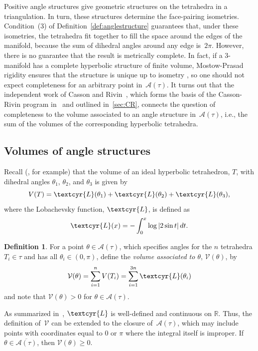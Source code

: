 \documentclass[reqno]{amsart}
\newcommand{\R}{\mathbb{R}}			%
\newcommand{\lob}{{\textcyr{L}}}		%
\theoremstyle{plain}
\theoremstyle{definition}
\newtheorem{defn}{Definition}[section]
\begin{document}
 Positive angle structures give geometric structures on the tetrahedra in a triangulation.  In turn, these structures determine the face-pairing isometries.  Condition~(3) of Definition~\ref{def:anglestructure} guarantees that, under these isometries, the tetrahedra fit together to fill the space around the edges of the manifold, because the sum of dihedral angles around any edge is~$2\pi$.  However, there is no guarantee that the result is metrically complete.  In fact, if a 3-manifold has a complete hyperbolic structure of finite volume, Mostow-Prasad rigidity ensures that the structure is unique up to isometry \cite{MostowRigidity} \cite{PrasadRigidity}, so one should not expect completeness for an arbitrary point in~$\mathcal A(\tau)$.  It turns out that the independent work of Casson and Rivin~\cite{Rivin}, which forms the basis of the Casson-Rivin program in~\cite{AngledtoHyperbolic} and outlined in~\ref{sec:CR}, connects the question of completeness to the volume associated to an angle structure in~$\mathcal A(\tau)$, i.e., the sum of the volumes of the corresponding hyperbolic tetrahedra.
 
 \subsection{Volumes of angle structures} \label{sec:volume}

Recall (\cite{MilnorHypGeom}, for example) that the volume of an ideal hyperbolic tetrahedron, $T$, with dihedral angles $\theta_1$, $\theta_2$, and $\theta_3$ is given by
$$
V(T)=\lob(\theta_1)+\lob(\theta_2)+\lob(\theta_3),
$$
where the Lobachevsky function, $\lob$, is defined as
$$
\lob(x)=-\int_0^x\log|2\sin t|\,dt.
$$  
\begin{defn}\label{def:volume}
For a point $\theta\in\mathcal A(\tau)$, which specifies angles for the $n$ tetrahedra $T_i\in\tau$ and has all $\theta_i\in(0,\pi)$, define the \emph{volume associated to $\theta$}, $\mathcal{V}(\theta)$, by
$$
\mathcal V(\theta) =
\displaystyle{\sum_{i=1}^{n}V(T_i)}= \displaystyle{\sum_{i=1}^{3n}\lob(\theta_i)} 
$$
 and note that $\mathcal{V}(\theta)>0$ for $\theta\in\mathcal A(\tau)$.
\end{defn}

As summarized in~\cite{AngledtoHyperbolic}, $\lob$ is well-defined and continuous on $\R$.  Thus, the definition of~$\mathcal V$ can be extended to the closure of~$\mathcal A(\tau)$, which may include points with coordinates equal to 0 or $\pi$ where the integral itself is improper. If $\theta\in\overline{\mathcal A(\tau)}$, then $\mathcal{V}(\theta)\ge0$.
\end{document}
